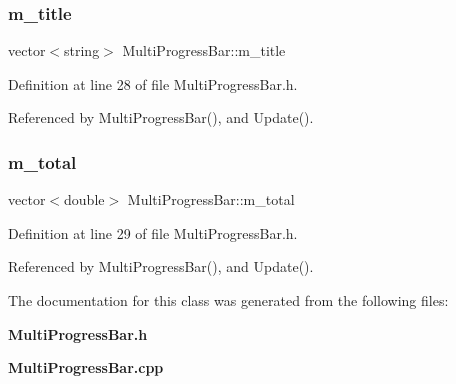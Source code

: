 \subsubsection{m\+\_\+title}
{\footnotesize\ttfamily vector$<$string$>$ Multi\+Progress\+Bar\+::m\+\_\+title\hspace{0.3cm}{\ttfamily [protected]}}



Definition at line 28 of file Multi\+Progress\+Bar.\+h.



Referenced by Multi\+Progress\+Bar(), and Update().

\mbox{\label{classMultiProgressBar_a8abca9cff474835ccabbd7a93ddbfe99_a8abca9cff474835ccabbd7a93ddbfe99}} 
\subsubsection{m\+\_\+total}
{\footnotesize\ttfamily vector$<$double$>$ Multi\+Progress\+Bar\+::m\+\_\+total\hspace{0.3cm}{\ttfamily [protected]}}



Definition at line 29 of file Multi\+Progress\+Bar.\+h.



Referenced by Multi\+Progress\+Bar(), and Update().



The documentation for this class was generated from the following files\+:\begin{DoxyCompactItemize}
\item 
\textbf{ Multi\+Progress\+Bar.\+h}\item 
\textbf{ Multi\+Progress\+Bar.\+cpp}\end{DoxyCompactItemize}
